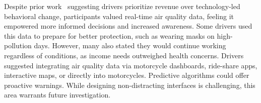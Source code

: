 Despite prior work~\cite{tieanklin2024rideshare} suggesting drivers prioritize revenue over technology-led behavioral change, participants valued real-time air quality data, feeling it empowered more informed decisions and increased awareness.
Some drivers used this data to prepare for better protection, such as wearing masks on high-pollution days.
However, many also stated they would continue working regardless of conditions, as income needs outweighed health concerns. 
Drivers suggested integrating air quality data via motorcycle dashboards, ride-share apps, interactive maps, or directly into motorcycles.
Predictive algorithms could offer proactive warnings.
While designing non-distracting interfaces is challenging, this area warrants future investigation.




